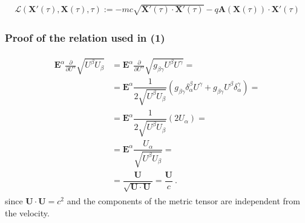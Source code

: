 \documentclass[letterpaper,10pt,english]{jupyterBook}
\begin{document}
\begin{equation*}
\begin{split}\mathscr{L}(\mathbf{X}'(\tau), \mathbf{X}(\tau), \tau) := - m c \sqrt{\mathbf{X}'(\tau) \cdot \mathbf{X}'(\tau)} - q \mathbf{A}(\mathbf{X}(\tau)) \cdot \mathbf{X}'(\tau)\end{split}
\end{equation*}\subsubsection*{Proof of the relation used in (1)}
\begin{equation}\label{equation:ch/relativity-special/notes:eq:proof:vel:der-c2}
\begin{split}\begin{aligned}
   \mathbf{E}^{\alpha} \frac{\partial}{\partial U^\alpha} \sqrt{U^{\beta} U_{\beta}}
   & = \mathbf{E}^{\alpha} \frac{\partial}{\partial U^\alpha} \sqrt{ g_{\beta \gamma} U^{\beta} U^{\gamma}} = \\
   & = \mathbf{E}^{\alpha} \dfrac{1}{2 \sqrt{U^\beta U_\beta}} \left( g_{\beta \gamma} \delta^{\beta}_{\alpha} U^{\gamma} +  g_{\beta \gamma} U^{\beta}\delta_{\alpha}^{\gamma} \right) = \\
   & = \mathbf{E}^{\alpha} \dfrac{1}{2 \sqrt{U^\beta U_\beta}} \left( 2 U_{\alpha} \right) = \\
   & = \mathbf{E}^{\alpha} \dfrac{U_{\alpha}}{\sqrt{U^\beta U_\beta}} = \\
   & = \dfrac{\mathbf{U}}{\sqrt{\mathbf{U} \cdot \mathbf{U}}}     
     = \dfrac{\mathbf{U}}{c}  \ .
\end{aligned}\end{split}
\end{equation}
\sphinxAtStartPar
since \(\mathbf{U} \cdot \mathbf{U} = c^2\) and the components of the metric tensor are independent from the velocity.
\end{document}
